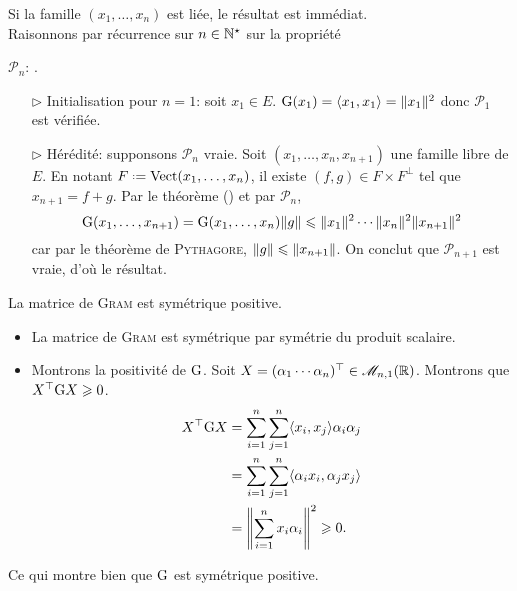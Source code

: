\begin{preuve}
    Si la famille $(x_1, \dots, x_n)$ est liée, le résultat est immédiat. \\
    Raisonnons par récurrence sur $n \in \mathbb{N}^\star$ sur la propriété
    \begin{center}
        $\mathscr{P}_n$: .
    \end{center}
    \begin{itemize}
        \item[$\rhd$] Initialisation pour $n = 1$: soit $x_1 \in E$. $\mathrm{G}(x_1) = \langle x_1, x_1 \rangle = \Vert x_1 \Vert^2$ donc $\mathscr{P}_1$ est vérifiée.
        \item[$\rhd$] Hérédité: supponsons $\mathscr{P}_n$ vraie. Soit $(x_1, \dots, x_n, x_{n+1})$ une famille libre de $E$. En notant $F \defeq \Vect(x_1, \dots, x_n)$, il existe $(f, g) \in F \times F^\perp$ tel que $x_{n+1} = f + g$. Par le théorème () et par $\mathscr{P}_n$, 
        $$\mathrm{G}(x_1, \dots, x_{n+1}) = \mathrm{G}(x_1, \dots, x_n) \Vert g \Vert \leqslant \Vert x_1 \Vert^2 \cdots \Vert x_n \Vert^2 \Vert x_{n+1} \Vert^2$$
        car par le théorème de \textsc{Pythagore}, $\Vert g \Vert \leqslant \Vert x_{n+1} \Vert$. On conclut que $\mathscr{P}_{n+1}$ est vraie, d'où le résultat. 
    \end{itemize}
\end{preuve}

\begin{prop}
    La matrice de \textsc{Gram} est symétrique positive.
\end{prop}

\begin{preuve}
    \begin{itemize}
        \item La matrice de \textsc{Gram} est symétrique par symétrie du produit scalaire.
        \item Montrons la positivité de $\mathrm{G}$. Soit $X = (\alpha_1 \cdots \alpha_n)^\top \in \mathscr{M}_{n,1}(\mathbb{R})$. Montrons que $X^\top \mathrm{G} X \geqslant 0$. 
        \begin{align*}
            X^\top \mathrm{G} X &= \sum_{i=1}^{n} \sum_{j=1}^{n} \langle x_i, x_j \rangle \alpha_i \alpha_j \\ 
            &= \sum_{i=1}^{n} \sum_{j=1}^{n} \langle \alpha_i x_i, \alpha_j x_j \rangle \\
            &= \left\Vert \sum_{i=1}^{n}x_i \alpha_i \right\Vert^2 \geqslant 0.
        \end{align*}
    \end{itemize}
   
    Ce qui montre bien que $\mathrm{G}$ est symétrique positive.
\end{preuve}

